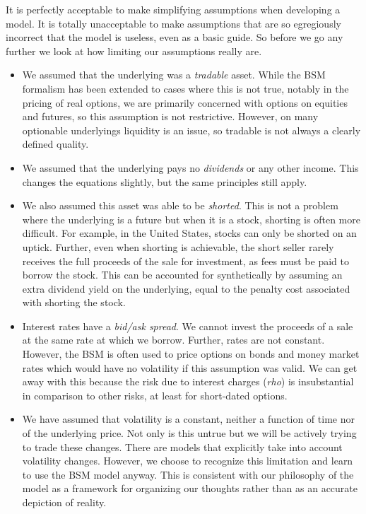 \documentclass[11pt]{report}
\begin{document}
		It is perfectly acceptable to make simplifying assumptions when developing a model. It is totally unacceptable to make assumptions that are so egregiously incorrect that the model is useless, even as a basic guide. So before we go any further we look at how limiting our assumptions really are.
		\begin{itemize}
			\item We assumed that the underlying was a \textit{tradable} asset. While the BSM formalism has been extended to cases where this is not true, notably in the pricing of real options, we are primarily concerned with options on equities and futures, so this assumption is not restrictive. However, on many optionable underlyings liquidity is an issue, so tradable is not always a clearly defined quality.
			\item We assumed that the underlying pays no \textit{dividends} or any other income. This changes the equations slightly, but the same principles still apply.
			\item We also assumed this asset was able to be \textit{shorted}. This is not a problem where the underlying is a future but when it is a stock, shorting is often more difficult. For example, in the United States, stocks can only be shorted on an uptick. Further, even when shorting is achievable, the short seller rarely receives the full proceeds of the sale for investment, as fees must be paid to borrow the stock. This can be accounted for synthetically by assuming an extra dividend yield on the underlying, equal to the penalty cost associated with shorting the stock.
			\item Interest rates have a \textit{bid/ask spread}. We cannot invest the proceeds of a sale at the same rate at which we borrow. Further, rates are not constant. However, the BSM is often used to price options on bonds and money market rates which would have no volatility if this assumption was valid. We can get away with this because the risk due to interest charges (\textit{rho}) is insubstantial in comparison to other risks, at least for short-dated options.
			\item We have assumed that volatility is a constant, neither a function of time nor of the underlying price. Not only is this untrue but we will be actively trying to trade these changes. There are models that explicitly take into account volatility changes. However, we choose to recognize this limitation and learn to use the BSM model anyway. This is consistent with our philosophy of the model as a framework for organizing our thoughts rather than as an accurate depiction of reality.

\end{itemize}
\end{document}
